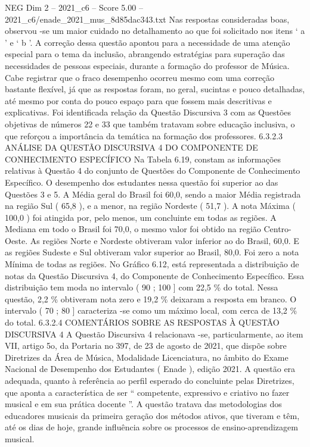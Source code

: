 \begin{textsample}{NEG Dim 2 – 2021\_c6 – Score 5.00 – 2021\_c6/enade\_2021\_mus\_8d85dac343.txt}
Nas respostas consideradas boas, observou -se um maior cuidado no detalhamento ao que foi solicitado nos itens ‘ a ’ e ‘ b ’.
A correção dessa questão apontou para a necessidade de uma atenção especial para o tema da inclusão, abrangendo estratégias para superação das necessidades de pessoas especiais, durante a formação do professor de Música.
Cabe registrar que o fraco desempenho ocorreu mesmo com uma correção bastante flexível, já que as respostas foram, no geral, sucintas e pouco detalhadas, até mesmo por conta do pouco espaço para que fossem mais descritivas e explicativas.
Foi identificada relação da Questão Discursiva 3 com as Questões objetivas de números 22 e 33 que também tratavam sobre educação inclusiva, o que reforçou a importância da temática na formação dos professores. 6.3.2.3 ANÁLISE DA QUESTÃO DISCURSIVA 4 DO COMPONENTE DE CONHECIMENTO ESPECÍFICO Na Tabela 6.19, constam as informações relativas à Questão 4 do conjunto de Questões do Componente de Conhecimento Específico.
O desempenho dos estudantes nessa questão foi superior ao das Questões 3 e 5.
A Média geral do Brasil foi 60,0, sendo a maior Média registrada na região Sul ( 65,8 ), e a menor, na região Nordeste ( 51,7 ).
A nota Máxima ( 100,0 ) foi atingida por, pelo menos, um concluinte em todas as regiões.
A Mediana em todo o Brasil foi 70,0, o mesmo valor foi obtido na região Centro-Oeste.
As regiões Norte e Nordeste obtiveram valor inferior ao do Brasil, 60,0.
E as regiões Sudeste e Sul obtiveram valor superior ao Brasil, 80,0.
Foi zero a nota Mínima de todas as regiões.
No Gráfico 6.12, está representada a distribuição de notas da Questão Discursiva 4, do Componente de Conhecimento Específico.
Essa distribuição tem moda no intervalo ( 90 ; 100 ] com 22,5 \% do total.
Nessa questão, 2,2 \% obtiveram nota zero e 19,2 \% deixaram a resposta em branco.
O intervalo ( 70 ; 80 ] caracteriza -se como um máximo local, com cerca de 13,2 \% do total. 6.3.2.4 COMENTÁRIOS SOBRE AS RESPOSTAS À QUESTÃO DISCURSIVA 4 A Questão Discursiva 4 relacionava -se, particularmente, ao item VII, artigo 5o, da Portaria no 397, de 23 de agosto de 2021, que dispõe sobre Diretrizes da Área de Música, Modalidade Licenciatura, no âmbito do Exame Nacional de Desempenho dos Estudantes ( Enade ), edição 2021.
A questão era adequada, quanto à referência ao perfil esperado do concluinte pelas Diretrizes, que aponta a característica de ser “ competente, expressivo e criativo no fazer musical e em sua prática docente ”.
A questão tratava das metodologias dos educadores musicais da primeira geração dos métodos ativos, que tiveram e têm, até os dias de hoje, grande influência sobre os processos de ensino-aprendizagem musical.

\end{textsample}
